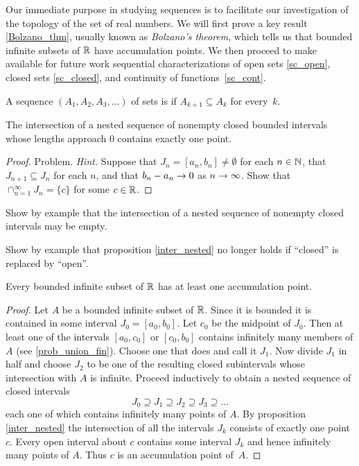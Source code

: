Our immediate purpose in studying sequences is to facilitate our investigation of the topology
of the set of real numbers.  We will first prove a key result \ref{Bolzano_thm}, usually known
as \emph{Bolzano's theorem}, which tells us that bounded infinite subsets of $\mathbb{R}$ have
accumulation points.  We then proceed to make available for future work sequential
characterizations of open sets \ref{sc_open}, closed sets \ref{sc_closed}, and continuity of
functions~\ref{sc_cont}.

\begin{defn}\label{nested} A sequence $(A_1, A_2, A_3, \dots)$ of sets is
 if $A_{k+1} \subseteq A_k$ for every~$k$.
\end{defn}

\begin{prop}\label{inter_nested} The intersection of a nested sequence of nonempty closed
bounded intervals whose lengths approach $0$ contains exactly one point.
\end{prop}

\begin{proof} Problem.  \emph{Hint.}  Suppose that $J_n = [a_n, b_n] \ne \emptyset$ for each
$n \in \mathbb{N}$, that $J_{n+1} \subseteq J_n$ for each $n$, and that $b_n - a_n \rightarrow 0$ as $n \rightarrow
\infty$. Show that $\cap_{n=1}^\infty J_n = \{c\}$ for some $c \in \mathbb{R}$. \ns
\end{proof}

\begin{prob} Show by example that the intersection of a nested sequence of nonempty closed intervals
may be empty.
\end{prob}

\begin{prob} Show by example that proposition \ref{inter_nested} no longer holds if ``closed'' is
replaced by ``open''.
\end{prob}

\begin{prop}\label{Bolzano_thm} Every bounded infinite subset of $\mathbb{R}$ has at
least one accumulation point.
\end{prop}

\begin{proof} Let $A$ be a bounded infinite subset of $\mathbb{R}$. Since it is bounded it is contained in
some interval $J_0 = [a_0,b_0]$.  Let $c_0$ be the midpoint of $J_0$. Then at least one of the
intervals $[a_0,c_0]$ or $[c_0,b_0]$ contains infinitely many members of $A$ (see
\ref{prob_union_fin}).  Choose one that does and call it $J_1$. Now divide $J_1$ in half and
choose $J_2$ to be one of the resulting closed subintervals whose intersection with $A$ is
infinite.  Proceed inductively to obtain a nested sequence of closed intervals
   \[ J_0 \supseteq J_1 \supseteq J_2 \supseteq J_3 \supseteq \dots \]
each one of which contains infinitely many points of $A$. By proposition \ref{inter_nested}
the intersection of all the intervals $J_k$ consists of exactly one point $c$. Every open
interval about $c$ contains some interval $J_k$ and hence infinitely many points of $A$. Thus
$c$ is an accumulation point of~$A$.
\end{proof}

